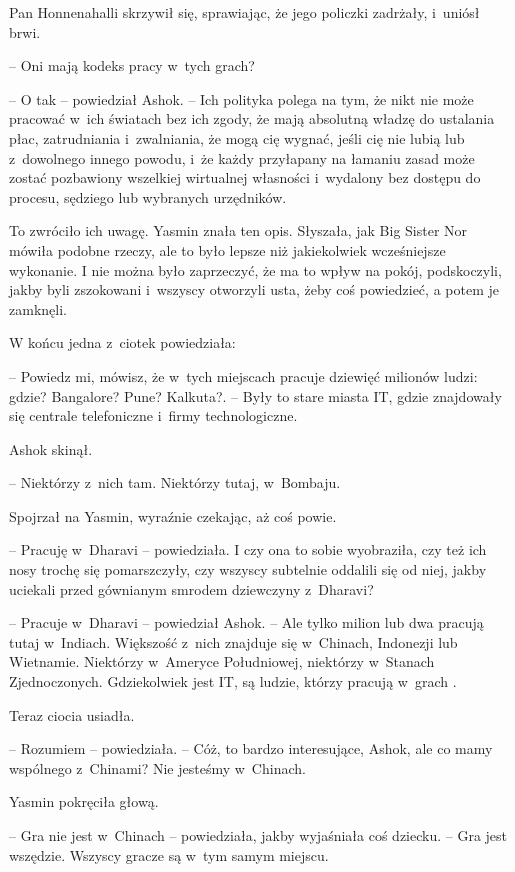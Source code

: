 \documentclass[oneside,polish,11pt,rmheadings]{mwbk}
\begin{document}
Pan Honnenahalli skrzywił się, sprawiając, że jego policzki zadrżały, i~uniósł brwi. 

-- Oni mają kodeks pracy w~tych grach? 

-- O tak -- powiedział Ashok. -- Ich polityka polega na tym, że nikt nie może pracować w~ich światach bez ich zgody, że mają absolutną władzę do ustalania płac, zatrudniania i~zwalniania, że mogą cię wygnać, jeśli cię nie lubią lub z~dowolnego innego powodu, i~że każdy przyłapany na łamaniu zasad może zostać pozbawiony wszelkiej wirtualnej własności i~wydalony bez dostępu do procesu, sędziego lub wybranych urzędników.

To zwróciło ich uwagę. Yasmin znała ten opis. Słyszała, jak Big Sister Nor mówiła podobne rzeczy, ale to było lepsze niż jakiekolwiek wcześniejsze wykonanie. I nie można było zaprzeczyć, że ma to wpływ na pokój, podskoczyli, jakby byli zszokowani i~wszyscy otworzyli usta, żeby coś powiedzieć, a potem je zamknęli.

W końcu jedna z~ciotek powiedziała: 

-- Powiedz mi, mówisz, że w~tych miejscach pracuje dziewięć milionów ludzi: gdzie? Bangalore? Pune? Kalkuta?. -- Były to stare miasta IT, gdzie znajdowały się centrale telefoniczne i~firmy technologiczne. 

Ashok skinął. 

-- Niektórzy z~nich tam. Niektórzy tutaj, w~Bombaju. 

Spojrzał na Yasmin, wyraźnie czekając, aż coś powie.

-- Pracuję w~Dharavi -- powiedziała. I czy ona to sobie wyobraziła, czy też ich nosy trochę się pomarszczyły, czy wszyscy subtelnie oddalili się od niej, jakby uciekali przed gównianym smrodem dziewczyny z~Dharavi?

-- Pracuje w~Dharavi -- powiedział Ashok. -- Ale tylko milion lub dwa pracują tutaj w~Indiach. Większość z~nich znajduje się w~Chinach, Indonezji lub Wietnamie. Niektórzy w~Ameryce Południowej, niektórzy w~Stanach Zjednoczonych. Gdziekolwiek jest IT, są ludzie, którzy pracują w~grach .

Teraz ciocia usiadła. 

-- Rozumiem -- powiedziała. -- Cóż, to bardzo interesujące, Ashok, ale co mamy wspólnego z~Chinami? Nie jesteśmy w~Chinach.

Yasmin pokręciła głową. 

-- Gra nie jest w~Chinach -- powiedziała, jakby wyjaśniała coś dziecku. -- Gra jest wszędzie. Wszyscy gracze są w~tym samym miejscu.
\end{document}
